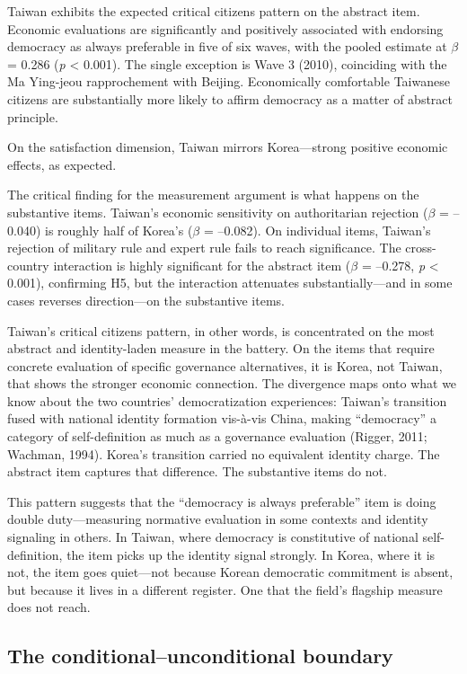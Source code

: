 \documentclass[
  12pt,
  12pt,
  letterpaper]{article}
\begin{document}
Taiwan exhibits the expected critical citizens pattern on the abstract
item. Economic evaluations are significantly and positively associated
with endorsing democracy as always preferable in five of six waves, with
the pooled estimate at \(\beta\) = 0.286 (\emph{p} \textless{} 0.001).
The single exception is Wave 3 (2010), coinciding with the Ma Ying-jeou
rapprochement with Beijing. Economically comfortable Taiwanese citizens
are substantially more likely to affirm democracy as a matter of
abstract principle.

On the satisfaction dimension, Taiwan mirrors Korea---strong positive
economic effects, as expected.

The critical finding for the measurement argument is what happens on the
substantive items. Taiwan's economic sensitivity on authoritarian
rejection (\(\beta\) = --0.040) is roughly half of Korea's (\(\beta\) =
--0.082). On individual items, Taiwan's rejection of military rule and
expert rule fails to reach significance. The cross-country interaction
is highly significant for the abstract item (\(\beta\) = --0.278,
\emph{p} \textless{} 0.001), confirming H5, but the interaction
attenuates substantially---and in some cases reverses direction---on the
substantive items.

Taiwan's critical citizens pattern, in other words, is concentrated on
the most abstract and identity-laden measure in the battery. On the
items that require concrete evaluation of specific governance
alternatives, it is Korea, not Taiwan, that shows the stronger economic
connection. The divergence maps onto what we know about the two
countries' democratization experiences: Taiwan's transition fused with
national identity formation vis-à-vis China, making ``democracy'' a
category of self-definition as much as a governance evaluation (Rigger,
2011; Wachman, 1994). Korea's transition carried no equivalent identity
charge. The abstract item captures that difference. The substantive
items do not.

This pattern suggests that the ``democracy is always preferable'' item
is doing double duty---measuring normative evaluation in some contexts
and identity signaling in others. In Taiwan, where democracy is
constitutive of national self-definition, the item picks up the identity
signal strongly. In Korea, where it is not, the item goes quiet---not
because Korean democratic commitment is absent, but because it lives in
a different register. One that the field's flagship measure does not
reach.

\subsection{The conditional--unconditional
boundary}\label{sec-results-boundary}
\end{document}
